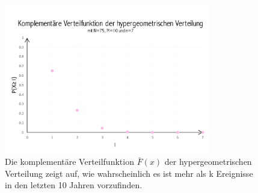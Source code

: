 \begin{refsection}
\begin{table}
\caption{Wahrscheinlichkeit $P(X = k)$ aller Ereignisse unseres
Beispiels und die Wahrscheinlichkeiten $P(X \ge k)$ der komplementären
Verteilfunktion. Die Rosa markierten Felder sind die Werte, die zur
Berechnung in \ref{Beispiel}) gebraucht wurden. }
\label{TabExt}
\end{table}

\begin{figure}
\centering
\includegraphics[width=0.8\textwidth]{extrem/HyperExt.pdf}
\caption{Die komplementäre Verteilfunktion $\bar{F}(x)$ der hypergeometrischen Verteilung zeigt auf, wie wahrscheinlich es ist mehr als k Ereignisse in den letzten 10 Jahren vorzufinden.}
\label{HyperExt}
\end{figure}


\end{refsection}
